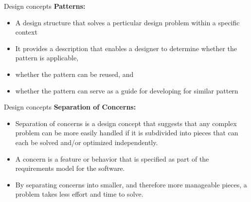 \documentclass{beamer}
\begin{document}
\begin{frame}{Design concepts}
	\textbf{Patterns:}
	\begin{itemize}
		\item A design structure that solves a perticular design problem within a specific context
		\item It provides a description that enables a designer to determine whether the pattern is applicable,
		\item whether the pattern can be reused, and 
		\item whether the pattern can serve as a guide for developing for similar pattern
	\end{itemize}
\end{frame}
\begin{frame}{Design concepts}
	\textbf{Separation of Concerns:}
	\begin{itemize}
		\item Separation of concerns is a design concept that suggests that any complex 
		problem can be more easily handled if it is subdivided into pieces that can each be 
		solved and/or optimized independently. 
		\item A concern is a feature or behavior that is 
		specified as part of the requirements model for the software.
		\item  By separating concerns into smaller, and therefore more manageable pieces, a problem 
		takes less effort and time to solve.
	\end{itemize}
\end{frame}
\end{document}
